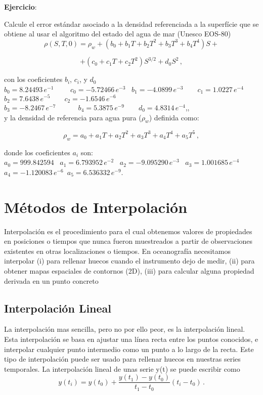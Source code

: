 \documentclass[
]{agujournal2019}
\begin{document}
\textbf{Ejercicio}:

Calcule el error estándar asociado a la densidad referenciada a la
superfície que se obtiene al usar el algoritmo del estado del agua de
mar (Unesco EOS-80)
\[\rho(S,T,0)=\rho_w + \left(b_0+b_1 T+b_2 T^2+b_3 T^{3}+b_4 T^{4}\right) S +\]

\[+\left(c_0+c_1 T+c_2 T^2\right) S^{3/2} + d_0 S^2\,,\]

con los coeficientes \(b_i\), \(c_i\), y \(d_0\)\\
\(b_0=8.24493\,e^{-1}\,\,\,\,\,\,\,\,\,\,\,\,\,\,c_0=-5.72466\,e^{-3}\)
~\(b_1=-4.0899\,e^{-3}\,\,\,\,\,\,\,\,\,\,\,\,c_1=1.0227\,e^{-4}\)\\
\(b_2=7.6438\,e^{-5}\,\,\,\,\,\,\,\,\,\,\,\,c_2=-1.6546\,e^{-6}\)\\
\(b_3=-8.2467\,e^{-7}\,\,\,\,\,\,\,\,\,\,\,\,\) ~
\(b_4=5.3875\,e^{-9}\,\,\,\,\,\,\,\,\,\,\,\,d_0=4.8314\,e^{-4}\),,\\

y la densidad de referencia para agua pura (\(\rho_w\)) definida como:

\[\rho_w=a_0+a_1 T+a_2 T^2+a_3 T^{3}+a_4 T^{4}+a_5 T^{5}\,,\]

donde los coeficientes \(a_i\) son:\\
\(a_0=999.842594\) ~\(a_1=6.793952\,e^{-2}\) ~\(a_2=-9.095290\,e^{-3}\)
~\(a_3=1.001685\,e^{-4}\)
~\(a_4=-1.120083\,e^{-6}\)~\(a_5=6.536332\,e^{-9}\).

\hypertarget{muxe9todos-de-interpolaciuxf3n}{%
\section{Métodos de
Interpolación}\label{muxe9todos-de-interpolaciuxf3n}}

Interpolación es el procedimiento para el cual obtenemos valores de
propiedades en posiciones o tiempos que nunca fueron muestreados a
partir de observaciones existentes en otras localizaciones o tiempos. En
oceanografía necesitamos interpolar (i) para rellenar huecos cuando el
instrumento dejo de medir, (ii) para obtener mapas espaciales de
contornos (2D), (iii) para calcular alguna propiedad derivada en un
punto concreto

\hypertarget{interpolaciuxf3n-lineal}{%
\subsection{Interpolación Lineal}\label{interpolaciuxf3n-lineal}}

La interpolación mas sencilla, pero no por ello peor, es la
interpolación lineal. Esta interpolación se basa en ajustar una línea
recta entre los puntos conocidos, e interpolar cualquier punto
intermedio como un punto a lo largo de la recta. Este tipo de
interpolación puede ser usado para rellenar huecos en nuestras series
temporales. La interpolación lineal de unas serie y(t) se puede escribir
como \[y(t_i)=y(t_0)+\frac{y(t_1)-y(t_0)}{t_1 - t_0}(t_i-t_0)\,.\]
\end{document}
